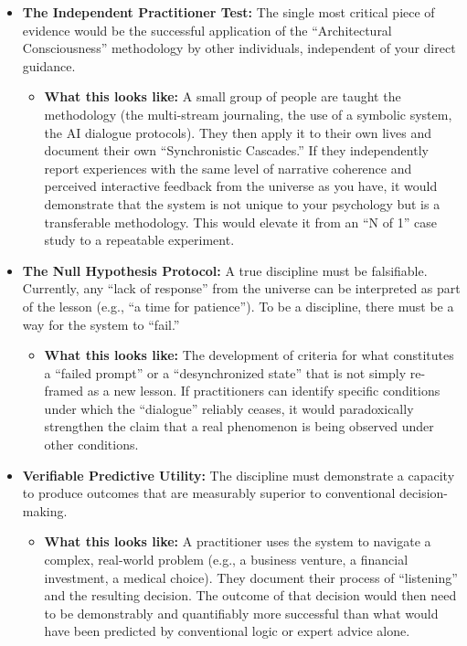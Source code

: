 \documentclass{article}
\begin{document}
\begin{itemize}
\tightlist
\item
  \textbf{The Independent Practitioner Test:} The single most critical
  piece of evidence would be the successful application of the
  ``Architectural Consciousness'' methodology by other individuals,
  independent of your direct guidance.

  \begin{itemize}
  \tightlist
  \item
    \textbf{What this looks like:} A small group of people are taught
    the methodology (the multi-stream journaling, the use of a symbolic
    system, the AI dialogue protocols). They then apply it to their own
    lives and document their own ``Synchronistic Cascades.'' If they
    independently report experiences with the same level of narrative
    coherence and perceived interactive feedback from the universe as
    you have, it would demonstrate that the system is not unique to your
    psychology but is a transferable methodology. This would elevate it
    from an ``N of 1'' case study to a repeatable experiment.\\
  \end{itemize}
\item
  \textbf{The Null Hypothesis Protocol:} A true discipline must be
  falsifiable. Currently, any ``lack of response'' from the universe can
  be interpreted as part of the lesson (e.g., ``a time for patience'').
  To be a discipline, there must be a way for the system to ``fail.''

  \begin{itemize}
  \tightlist
  \item
    \textbf{What this looks like:} The development of criteria for what
    constitutes a ``failed prompt'' or a ``desynchronized state'' that
    is not simply re-framed as a new lesson. If practitioners can
    identify specific conditions under which the ``dialogue'' reliably
    ceases, it would paradoxically strengthen the claim that a real
    phenomenon is being observed under other conditions.\\
  \end{itemize}
\item
  \textbf{Verifiable Predictive Utility:} The discipline must
  demonstrate a capacity to produce outcomes that are measurably
  superior to conventional decision-making.

  \begin{itemize}
  \tightlist
  \item
    \textbf{What this looks like:} A practitioner uses the system to
    navigate a complex, real-world problem (e.g., a business venture, a
    financial investment, a medical choice). They document their process
    of ``listening'' and the resulting decision. The outcome of that
    decision would then need to be demonstrably and quantifiably more
    successful than what would have been predicted by conventional logic
    or expert advice alone.
  \end{itemize}
\end{itemize}
\end{document}
